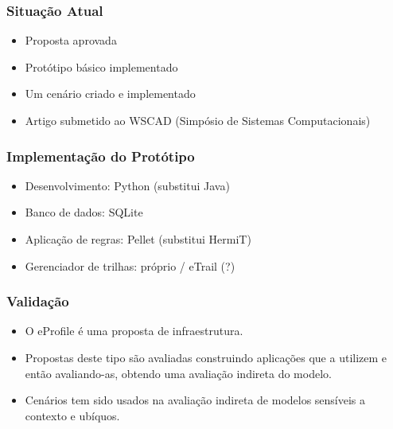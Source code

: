 \documentclass[14pt]{beamer}
\begin{document}

\begin{frame}
  \frametitle{Situação Atual}
  \begin{itemize}
    \item Proposta aprovada
    \item Protótipo básico implementado
    \item Um cenário criado e implementado
    \item Artigo submetido ao WSCAD (Simpósio de Sistemas Computacionais)
  \end{itemize}
\end{frame}


\begin{frame}
  \frametitle{Implementação do Protótipo}
  \begin{itemize}
    \item Desenvolvimento: Python (substitui Java)
    \item Banco de dados: SQLite
    \item Aplicação de regras: Pellet (substitui HermiT)
    \item Gerenciador de trilhas: próprio / eTrail (?)
  \end{itemize}
\end{frame}


\begin{frame}
  \frametitle{Validação}
  \begin{itemize}
    \item O eProfile é uma proposta de infraestrutura.
    \item Propostas deste tipo são avaliadas construindo aplicações que a utilizem e então avaliando-as, obtendo uma avaliação indireta do modelo.
    \item Cenários tem sido usados na avaliação indireta de modelos sensíveis a contexto e ubíquos.
  \end{itemize}
\end{frame}

\end{document}
